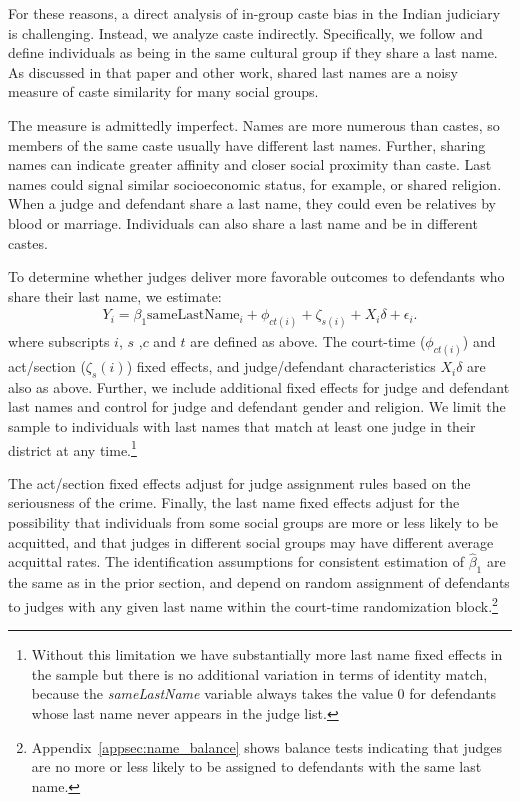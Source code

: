 \documentclass[12pt,english]{article}
\begin{document}
For these reasons, a direct analysis of in-group caste bias in the Indian judiciary is challenging. Instead, we analyze caste indirectly. Specifically, we follow \citet{fisman2017cultural} and define individuals as being in the same cultural group if they share a last name. As discussed in that paper and other work, shared last names are a noisy measure of caste similarity for many social groups. 

The measure is admittedly imperfect. Names are more numerous than castes, so members of the same caste usually have different last names. Further, sharing names can indicate greater affinity and closer social proximity than caste. Last names could signal similar socioeconomic status, for example, or shared religion. When a judge and defendant share a last name, they could even be relatives by blood or marriage. Individuals can also share a last name and be in different castes.

To determine whether judges deliver more favorable outcomes to defendants who share their last name, we estimate:
\begin{equation}
  \label{eq:lastname}
  \begin{split}
    Y_{i} = \beta_{1} \text{sameLastName}_{i} +  \phi_{ct(i)} + \zeta_{s(i)}  + X_i \delta + \epsilon_{i}\text{.}
  \end{split}
\end{equation}
where subscripts $i$, $s$ ,$c$ and $t$ are defined as above. The court-time ($\phi_{ct(i)}$) and act/section ($\zeta_s(i)$) fixed effects, and judge/defendant characteristics $X_i \delta$ are also as above. Further, we include additional fixed effects for judge and defendant last names and control for judge and defendant gender and religion. We limit the sample to individuals with last names that match at least one judge in their district at any time.\footnote{Without this limitation we have substantially more last name fixed effects in the sample but there is no additional variation in terms of identity match, because the \textit{sameLastName} variable always takes the value 0 for defendants whose last name never appears in the judge list.} 

The act/section fixed effects adjust for judge assignment rules based on the seriousness of the crime. Finally, the last name fixed effects adjust for the possibility that individuals from some social groups are more or less likely to be acquitted, and that judges in different social groups may have different average acquittal rates. The identification assumptions for consistent estimation of $\hat{\beta}_1$ are the same as in the prior section, and depend on random assignment of defendants to judges with any given last name within the court-time randomization block.\footnote{Appendix~\ref{appsec:name_balance} shows balance tests indicating that judges are no more or less likely to be assigned to defendants with the same last name.}
\end{document}
